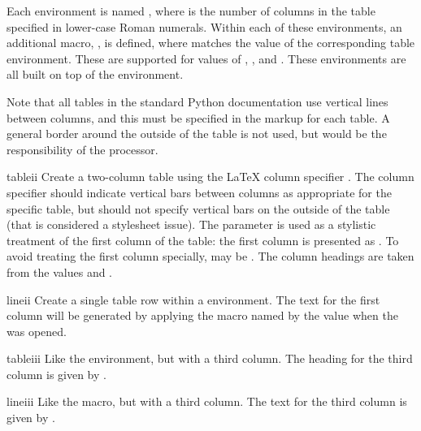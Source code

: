 \documentclass{howto}
\begin{document}
    Each environment is named , where 
    is the number of columns in the table specified in lower-case
    Roman numerals.  Within each of these environments, an additional
    macro, , is defined, where 
    matches the  value of the corresponding table
    environment.  These are supported for  values of
    , , and .  These environments are all
    built on top of the  environment.

    Note that all tables in the standard Python documentation use
    vertical lines between columns, and this must be specified in the
    markup for each table.  A general border around the outside of the
    table is not used, but would be the responsibility of the
    processor.

    \begin{envdesc}{tableii}{}
      Create a two-column table using the \LaTeX{} column specifier
      .  The column specifier should indicate vertical
      bars between columns as appropriate for the specific table, but
      should not specify vertical bars on the outside of the table
      (that is considered a stylesheet issue).  The 
      parameter is used as a stylistic treatment of the first column
      of the table: the first column is presented as
      .  To avoid treating the first
      column specially,  may be .  The
      column headings are taken from the values  and
      .
    \end{envdesc}

    \begin{macrodesc}{lineii}{}
      Create a single table row within a  environment.
      The text for the first column will be generated by applying the
      macro named by the  value when the 
      was opened.
    \end{macrodesc}

    \begin{envdesc}{tableiii}{}
      Like the  environment, but with a third column.
      The heading for the third column is given by .
    \end{envdesc}

    \begin{macrodesc}{lineiii}{}
      Like the  macro, but with a third column.  The
      text for the third column is given by .
    \end{macrodesc}
\end{document}
